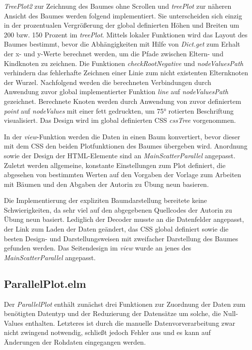 \documentclass[usegeometry=true]{scrartcl}
\begin{document}
\textit{TreePlot2} zur Zeichnung des Baumes ohne Scrollen und \textit{treePlot} zur näheren Ansicht des Baumes werden folgend implementiert. 
Sie unterscheiden sich einzig in der prozentualen Vergrößerung der global definierten Höhen und Breiten um 200 bzw. 150 Prozent im \textit{treePlot}.
Mittels lokaler Funktionen wird das Layout des Baumes bestimmt, bevor die Abhängigkeiten mit Hilfe von \textit{Dict.get} 
zum Erhalt der x- und y-Werte berechnet werden, um die Pfade zwischen Eltern- und Kindknoten zu zeichnen. 
Die Funktionen \textit{checkRootNegative} und \textit{nodeValuesPath} verhindern das fehlerhafte Zeichnen einer Linie zum nicht existenten Elternknoten der Wurzel.
Nachfolgend werden die berechneten Verbindungen durch Anwendung zuvor global implementierter Funktion \textit{line} auf \textit{nodeValuesPath} gezeichnet.
Berechnete Knoten werden durch Anwendung von zuvor definiertem \textit{point} auf \textit{nodeValues} mit einer fett gedruckten, um 75° rotierten Beschriftung visualisiert. 
Das Design wird im global definierten CSS \textit{cssTree} vorgenommen. 

In der \textit{view}-Funktion werden die Daten in einen Baum konvertiert, 
bevor dieser mit dem CSS den beiden Plotfunktionen des Baumes übergeben wird.
Anordnung sowie der Design der HTML-Elemente sind an \textit{MainScatterParallel} angepasst. 
Zuletzt werden allgemeine, konstante Einstellungen zum Plot definiert, die abgesehen von bestimmten Werten
auf den Vorgaben der Vorlage zum Arbeiten mit Bäumen und den Abgaben der Autorin zu Übung neun basieren.

Die Implementierung der expliziten Baumdarstellung bereitete keine Schwierigkeiten, 
da sehr viel auf den abgegebenen Quellcodes der Autorin zu Übung neun basiert. 
Lediglich der Decoder musste an die Datenfelder angepasst, der Link zum Laden der Daten geändert, das CSS global definiert 
sowie die besten Design- und Darstellungsweisen mit zweifacher Darstellung des Baumes gefunden werden. 
Das Seitendesign im \textit{view} wurde an jenes des \textit{MainScatterParallel} angepasst. 

\subsection{ParallelPlot.elm}
Der \textit{ParallelPlot} enthält zunächst drei Funktionen zur Zuordnung der Daten zum benötigten Datentyp und der Reduzierung der Datensätze um solche, 
die Null-Values enthalten. 
Letzteres ist durch die manuelle Datenvorverarbeitung zwar nicht zwingend notwendig, 
schließt jedoch Fehler aus und es kann auf Änderungen der Rohdaten eingegangen werden. 
\end{document}
